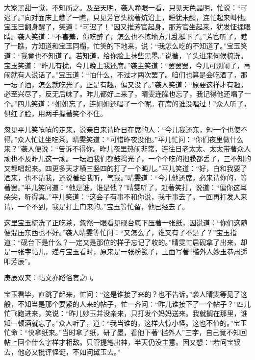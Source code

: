 \begin{parag}
    大家黑甜一觉，不知所之。及至天明，袭人睁眼一看，只见天色晶明，忙说：“可迟了。”向对面床上瞧了一瞧，只见芳官头枕著炕沿上，睡犹未醒，连忙起来叫他。宝玉已翻身醒了，笑道：“可迟了！”因又推芳官起身。那芳官坐起来，犹发怔揉眼睛。袭人笑道：“不害羞，你吃醉了，怎么也不拣地方儿乱挺下了。”芳官听了，瞧了一瞧，方知道和宝玉同榻，忙笑的下地来，说：“我怎么吃的不知道了。”宝玉笑道：“我竟也不知道了。若知道，给你脸上抹些黑墨。”说著，丫头进来伺候梳洗。宝玉笑道：“昨儿有扰，今儿晚上我还席。”袭主笑道：“罢罢罢，今儿可别闹了，再闹就有人说话了。”宝玉道：“怕什么，不过才两次罢了。咱们也算是会吃酒了，那一坛子酒，怎么就吃光了。正是有趣，偏又没了。”袭人笑道：“原要这样才有趣。必至兴尽了，反无后味了。昨儿都好上来了，晴雯连臊也忘了，我记得他还唱了一个。”四儿笑道：“姐姐忘了，连姐姐还唱了一个呢。在席的谁没唱过！”众人听了，俱红了脸，用两手握著笑个不住。
\end{parag}


\begin{parag}
    忽见平儿笑嘻嘻的走来，说亲自来请昨日在席的人：“今儿我还东，短一个也使不得。”众人忙让坐吃茶。晴雯笑道：“可惜昨夜没他。”平儿忙问：“你们夜里做什么来？”袭人便说：“告诉不得你。昨儿夜里热闹非常，连往日老太太、太太带著众人顽也不及昨儿这一顽。一坛酒我们都鼓捣光了，一个个吃的把臊都丢了，三不知的又都唱起来。四更多天才横三竖四的打了一个盹儿。”平儿笑道：“好，白和我要了酒来，也不请我，还说著给我听，气我。”晴雯道：“今儿他还席，必来请你的，等著罢。”平儿笑问道：“他是谁，谁是他？”晴雯听了，赶著笑打，说道：“偏你这耳朵尖，听得真。”平儿笑道：“这会子有事不和你说，我干事去了。一回再打发人来请，一个不到，我是打上门来的。”宝玉等忙留，他已经去了。
\end{parag}


\begin{parag}
    这里宝玉梳洗了正吃茶，忽然一眼看见砚台底下压著一张纸，因说道：“你们这随便混压东西也不好。”袭人晴雯等忙问：“又怎么了，谁又有了不是了？”宝玉指道：“砚台下是什么？一定又是那位的样子忘记了收的。”晴雯忙启砚拿了出来，却是一张字帖儿，递与宝玉看时，原来是一张粉笺子，上面写著“槛外人妙玉恭肃遥叩芳辰”。\begin{note}庚辰双夹：帖文亦蹈俗套之□。\end{note}宝玉看毕，直跳了起来，忙问：“这是谁接了来的？也不告诉。”袭人晴雯等见了这般，不知当是那个要紧的人来的帖子，忙一齐问：“昨儿谁接下了一个帖子？”四儿忙飞跑进来，笑说：“昨儿妙玉并没亲来，只打发个妈妈送来。我就搁在那里，谁知一顿酒就忘了。”众人听了，道：“我当谁的，这样大惊小怪。这也不值的。”宝玉忙命：“快拿纸来。”当时拿了纸，研了墨，看他下著“槛外人”三字，自己竟不知回帖上回个什么字样才相敌。只管提笔出神，半天仍没主意。因又想：“若问宝钗去，他必又批评怪诞，不如问黛玉去。”
\end{parag}



